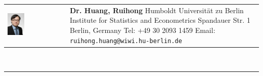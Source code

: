 \documentclass[a4paper,10pt]{article}
\begin{document}
\fancyhf{}
\renewcommand{\headrulewidth}{0pt}
\renewcommand{\footrulewidth}{1pt}
\renewcommand\footrule{\begin{minipage}{1\textwidth}
\hrule width \hsize height 2pt \kern 1mm \hrule width \hsize   
\end{minipage}\par}
\pagestyle{fancy}
\begin{tabular}[h]{p{}p{}}
  \vfill\hspace{-10pt}\includegraphics[width=0.3\textwidth]{bew/ruihong_2013.jpg} &\vspace{1pt}\large{\textbf{Dr. Huang, Ruihong}\newline 
Humboldt Universit\"at zu Berlin \newline 
Institute for Statistics and Econometrics  ­\newline
Spandauer Str. 1  \newline
10178 Berlin, Germany \newline
Tel: +49 30 2093 1459 \newline
Email: \verb|ruihong.huang@wiwi.hu-berlin.de| } \\
\end{tabular}\\
\rule[5pt]{1\textwidth}{1pt}\par
\setlength{\tabcolsep}{10pt}
\setlength{\extrarowheight}{6pt}
\end{document}
